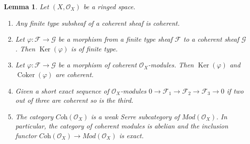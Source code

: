 \documentclass{stacks-project}
\theoremstyle{plain}
\newtheorem{lemma}[subsection]{Lemma}
\theoremstyle{definition}
\theoremstyle{remark}
\numberwithin{equation}{subsection}
\def\Ker{\mathop{\mathrm{Ker}}}
\def\Coker{\mathop{\mathrm{Coker}}}
\begin{document}
\begin{lemma}
\label{lemma-coherent-abelian}
Let $(X, \mathcal{O}_X)$ be a ringed space.
\begin{enumerate}
\item Any finite type subsheaf of a coherent sheaf is coherent.
\item Let $\varphi : \mathcal{F} \to \mathcal{G}$
be a morphism from a finite type sheaf $\mathcal{F}$
to a coherent sheaf $\mathcal{G}$. Then $\Ker(\varphi)$ is of finite type.
\item Let $\varphi : \mathcal{F} \to \mathcal{G}$ be a morphism
of coherent $\mathcal{O}_X$-modules. Then
$\Ker(\varphi)$ and
$\Coker(\varphi)$ are coherent.
\item Given a short exact sequence of $\mathcal{O}_X$-modules
$0 \to \mathcal{F}_1 \to \mathcal{F}_2 \to \mathcal{F}_3 \to 0$
if two out of three are coherent so is the third.
\item The category $\textit{Coh}(\mathcal{O}_X)$ is a weak Serre subcategory
of $\textit{Mod}(\mathcal{O}_X)$. In particular, the category of
coherent modules is abelian and the inclusion functor
$\textit{Coh}(\mathcal{O}_X) \to \textit{Mod}(\mathcal{O}_X)$
is exact.
\end{enumerate}
\end{lemma}
\end{document}
